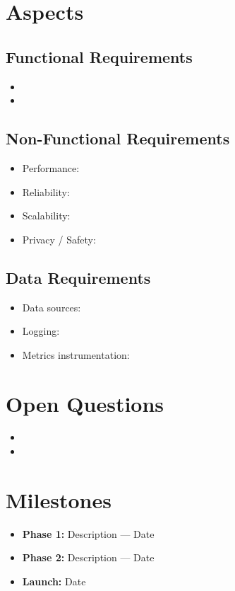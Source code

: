 \documentclass[11pt]{article}
\begin{document}
\section{Aspects}
\subsection{Functional Requirements}
\begin{itemize}[leftmargin=*]
    \item 
    \item 
\end{itemize}

\subsection{Non-Functional Requirements}
\begin{itemize}[leftmargin=*]
    \item Performance:
    \item Reliability:
    \item Scalability:
    \item Privacy / Safety:
\end{itemize}

\subsection{Data Requirements}
\begin{itemize}[leftmargin=*]
    \item Data sources:
    \item Logging:
    \item Metrics instrumentation:
\end{itemize}

\section{Open Questions}
\begin{itemize}[leftmargin=*]
    \item 
    \item 
\end{itemize}

\section{Milestones}
\begin{itemize}[leftmargin=*]
    \item \textbf{Phase 1:} Description --- Date
    \item \textbf{Phase 2:} Description --- Date
    \item \textbf{Launch:} Date
\end{itemize}
\end{document}
